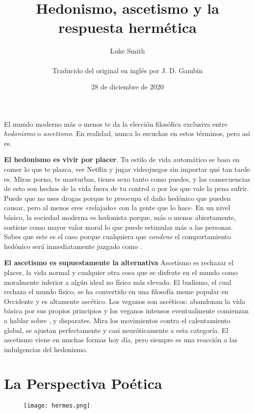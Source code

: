 \documentclass{article}
\title{Hedonismo, ascetismo y la respuesta hermética}
\author
{
	Luke Smith\\\\
	\small{Traducido del original en inglés por J. D. Gambín}
}
\date{\small{28 de diciembre de 2020}}
\begin{document}
	\maketitle

	El mundo moderno más o menos te da la elección filosófica
	exclusiva entre \textit{hedonismo} o \textit{ascetismo}.
	En realidad, nunca lo escuchas en estos términos, pero así es.

	\textbf{El hedonismo es vivir por placer}. Tu estilo de vida automático
	se basa en comer lo que te plazca, ver Netflix y jugar videojuegos sin
	importar qué tan tarde es. Miras porno, te masturbas, tienes sexo tanto
	como puedes, y las consecuencias de esto son hechos de la vida fuera de
	tu control o por los que vale la pena sufrir. Puede que no uses drogas
	porque te preocupa el daño hedónico que pueden causar, pero al menos
	eres «relajado» con la gente que lo hace. En un nivel básico, la
	sociedad moderna es hedonista porque, más o menos abiertamente, sostiene
	como mayor valor moral lo que puede estimular más a las personas. Sabes
	que este es el caso porque cualquiera que \textit{condene} el
	comportamiento hedónico será inmediatamente juzgado como
	.

	\textbf{El ascetismo es supuestamente la alternativa
	} Ascetismo es rechazar el placer, la vida normal
	y cualquier otra cosa que se disfrute en el mundo como moralmente
	inferior a algún ideal no físico más elevado. El budismo, el cual
	rechaza el mundo físico, se ha convertido en una filosofía meme popular
	en Occidente y es altamente ascético. Los veganos son ascéticos:
	abandonan la vida básica por sus propios principios y los veganos
	intensos eventualmente comienzan a hablar sobre ,
	 y disparates. Mira los movimientos contra el
	calentamiento global, se ajustan perfectamente y casi neuróticamente a
	esta categoría. El ascetismo viene en muchas formas hoy día, pero
	siempre es una reacción a las indulgencias del hedonismo.

	\newpage

	\section*{La Perspectiva Poética}

	\begin{figure}[ht]
	\centering
	\texttt{[image: hermes.png]}
	\end{figure}	
\end{document}
